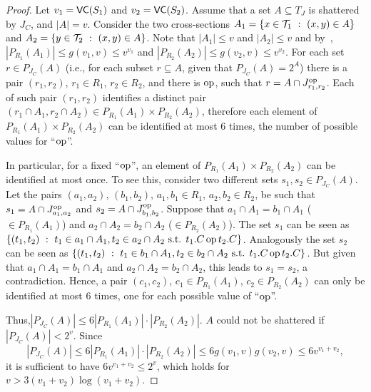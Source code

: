 \begin{proof}
  Let $v_1=\mathsf{VC}(S_1)$ and $v_2=\mathsf{VC}(S_2)$. Assume that a set $A\subseteq T_J$ is
  shattered by $J_C$, and $|A|=v$.  Consider the two cross-sections $A_1 =
  \{x\in {\cal T}_1 ~:~ (x,y)\in A\}$ and $A_2 = \{y\in {\cal T}_2 ~:~ (x,y)\in A\}$.
  Note that $|A_1|\leq v$ and $|A_2|\leq v$ and
  by~\citep[Corol.~14.4.3]{AlonS08}, %
  $|P_{R_1} (A_1)|\leq g(v_1,v)\le v^{v_1}$ and $|P_{R_2}
  (A_2)|\leq g(v_2,v) \le v^{v_2}$. For each set $r \in
  P_{J_C}(A)$ (i.e., for each subset $r\subseteq A$, given that
  $P_{J_C}(A)=2^A$)  there is a pair $(r_1,r_2)$, $r_1\in R_1$, $r_2\in R_2$,
  and there is $\operatorname{op}$, such that $r = A \cap J^{\operatorname{op}}_{r_1,r_2}$. Each of such
  pair $(r_1,r_2)$ identifies a distinct pair $(r_1\cap A_1, r_2\cap A_2) \in
  P_{R_1}(A_1)\times P_{R_2}(A_2)$, therefore each element of
  $P_{R_1}(A_1)\times P_{R_2}(A_2)$ can be identified at most $6$ times, the
  number of possible values for ``$\operatorname{op}$''. 

  In particular, for a fixed ``$\operatorname{op}$'', an element of $P_{R_1}(A_1)\times
  P_{R_2}(A_2)$ can be identified at most once.  To see this, consider two
  different sets $s_1, s_2 \in P_{J_C}(A)$. Let the pairs $(a_1,a_2)$,
  $(b_1,b_2)$, $a_1,b_1\in R_1$, $a_2,b_2\in R_2$, be such that $s_1 = A \cap
  J^{\operatorname{op}}_{a_1,a_2}$ and $s_2 = A \cap J^{\operatorname{op}}_{b_1,b_2}$. Suppose that $a_1\cap
  A_1 = b_1\cap A_1$  ($\in P_{R_1}(A_1)$) and $ a_2 \cap A_2 = b_2 \cap A_2$
  ($\in P_{R_2}(A_2)$). The set $s_1$ can be seen as $\{(t_1,t_2) ~:~ t_1\in
  a_1\cap A_1, t_2\in a_2\cap A_2 \mbox{ s.t.  } t_1.C \operatorname{op} t_2.C\}$. Analogously
  the set $s_2$ can be seen as $\{(t_1,t_2) ~:~ t_1\in b_1\cap A_1, t_2\in
  b_2\cap A_2 \mbox{ s.t. } t_1.C \operatorname{op} t_2.C\}$. But given that $a_1\cap A_1 =
  b_1\cap A_1$ and $ a_2 \cap A_2 = b_2 \cap A_2$, this leads to $s_1=s_2$, a
  contradiction. Hence, a pair $(c_1,c_2)$, $c_1\in P_{R_1}(A_1)$, $c_2\in
  P_{R_2}(A_2)$ can only be identified at most $6$ times, one for each possible
  value of ``$\operatorname{op}$''.  

  Thus,$ |P_{J_C} (A)|\leq 6|P_{R_1} (A_1)|\cdot |P_{R_2} (A_2)|.$ $A$ could not
  be shattered if $|P_{J_C}(A)|< 2^v$. Since 
  \[
  |P_{J_C}(A)|\leq 6|P_{R_1} (A_1)|\cdot |P_{R_2} (A_2)|\leq
  6g(v_1,v)g(v_2,v)\leq 6v^{v_1+v_2}, %
  \]
  it is sufficient to have $6v^{v_1+v_2}\le 2^v$, which holds for $v>
  3(v_1+v_2)\log(v_1+v_2)$.
\end{proof}


